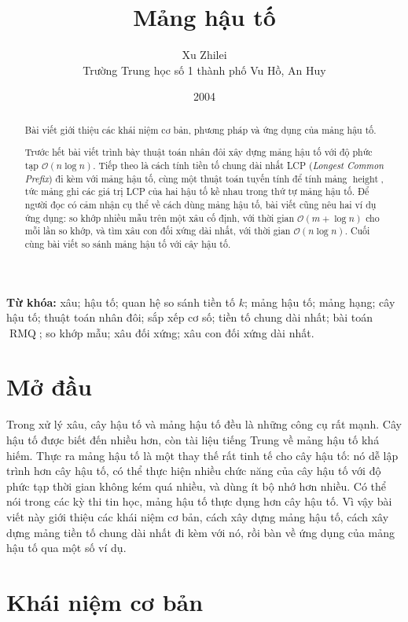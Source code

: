 \documentclass[11pt]{article}
\title{Mảng hậu tố}
\author{Xu Zhilei\\Trường Trung học số 1 thành phố Vu Hồ, An Huy}
\date{2004}
\newcommand{\Oh}{\mathcal{O}}
\newcommand{\Height}{\operatorname{height}}
\newcommand{\RMQ}{\operatorname{RMQ}}
\begin{document}
\maketitle


\begin{abstract}
Bài viết giới thiệu các khái niệm cơ bản, phương pháp và ứng dụng của mảng
hậu tố.

Trước hết bài viết trình bày thuật toán nhân đôi xây dựng mảng hậu tố với độ
phức tạp $\Oh(n\log n)$. Tiếp theo là cách tính tiền tố chung dài nhất LCP
(\textit{Longest Common Prefix}) đi kèm với mảng hậu tố, cùng một thuật toán
tuyến tính để tính mảng \(\Height\), tức mảng ghi các giá trị LCP của hai hậu
tố kề nhau trong thứ tự mảng hậu tố. Để người đọc có cảm nhận cụ thể về cách
dùng mảng hậu tố, bài viết cũng nêu hai ví dụ ứng dụng: so khớp nhiều mẫu
trên một xâu cố định, với thời gian \(\Oh(m+\log n)\) cho mỗi lần so khớp, và
tìm xâu con đối xứng dài nhất, với thời gian \(\Oh(n\log n)\). Cuối cùng bài
viết so sánh mảng hậu tố với cây hậu tố.
\end{abstract}

\noindent\textbf{Từ khóa:} xâu; hậu tố; quan hệ so sánh tiền tố \(k\); mảng
hậu tố; mảng hạng; cây hậu tố; thuật toán nhân đôi; sắp xếp cơ số; tiền tố
chung dài nhất; bài toán \(\RMQ\); so khớp mẫu; xâu đối xứng; xâu con đối
xứng dài nhất.

\section{Mở đầu}

Trong xử lý xâu, cây hậu tố và mảng hậu tố đều là những công cụ rất mạnh.
Cây hậu tố được biết đến nhiều hơn, còn tài liệu tiếng Trung về mảng hậu tố
khá hiếm. Thực ra mảng hậu tố là một thay thế rất tinh tế cho cây hậu tố: nó
dễ lập trình hơn cây hậu tố, có thể thực hiện nhiều chức năng của cây hậu tố
với độ phức tạp thời gian không kém quá nhiều, và dùng ít bộ nhớ hơn nhiều.
Có thể nói trong các kỳ thi tin học, mảng hậu tố thực dụng hơn cây hậu tố.
Vì vậy bài viết này giới thiệu các khái niệm cơ bản, cách xây dựng mảng hậu
tố, cách xây dựng mảng tiền tố chung dài nhất đi kèm với nó, rồi bàn về ứng
dụng của mảng hậu tố qua một số ví dụ.

\section{Khái niệm cơ bản}
\end{document}
